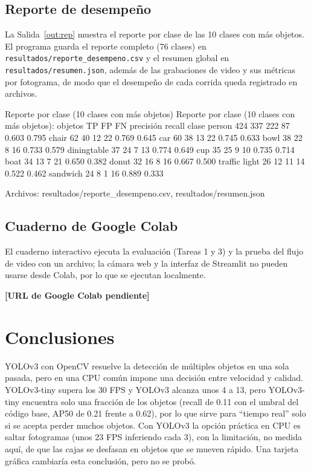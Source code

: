 \documentclass[11pt,letterpaper]{article}
\begin{document}
\subsection{Reporte de desempeño}

La Salida~\ref{out:rep} muestra el reporte por clase de las 10 clases con más objetos. El programa guarda el reporte completo (76 clases) en \texttt{resultados/reporte\_desempeno.csv} y el resumen global en \texttt{resultados/resumen.json}, además de las grabaciones de video y sus métricas por fotograma, de modo que el desempeño de cada corrida queda registrado en archivos.

\begin{consola}[label=out:rep]{Reporte por clase (10 clases con más objetos)}
Reporte por clase (10 clases con más objetos):
               objetos   TP   FP  FN  precisión  recall
clase
person             424  337  222  87      0.603   0.795
chair               62   40   12  22      0.769   0.645
car                 60   38   13  22      0.745   0.633
bowl                38   22    8  16      0.733   0.579
diningtable         37   24    7  13      0.774   0.649
cup                 35   25    9  10      0.735   0.714
boat                34   13    7  21      0.650   0.382
donut               32   16    8  16      0.667   0.500
traffic light       26   12   11  14      0.522   0.462
sandwich            24    8    1  16      0.889   0.333

Archivos: resultados/reporte_desempeno.csv, resultados/resumen.json
\end{consola}

\subsection{Cuaderno de Google Colab}

El cuaderno interactivo ejecuta la evaluación (Tareas 1 y 3) y la prueba del flujo de video con un archivo; la cámara web y la interfaz de Streamlit no pueden usarse desde Colab, por lo que se ejecutan localmente.

\begin{center}
    \textbf{[URL de Google Colab pendiente]}
\end{center}

\section{Conclusiones}

YOLOv3 con OpenCV resuelve la detección de múltiples objetos en una sola pasada, pero en una CPU común impone una decisión entre velocidad y calidad. YOLOv3-tiny supera los 30 FPS y YOLOv3 alcanza unos 4 a 13, pero YOLOv3-tiny encuentra solo una fracción de los objetos (recall de 0.11 con el umbral del código base, AP50 de 0.21 frente a 0.62), por lo que sirve para ``tiempo real'' solo si se acepta perder muchos objetos. Con YOLOv3 la opción práctica en CPU es saltar fotogramas (unos 23 FPS inferiendo cada 3), con la limitación, no medida aquí, de que las cajas se desfasan en objetos que se mueven rápido. Una tarjeta gráfica cambiaría esta conclusión, pero no se probó.
\end{document}
